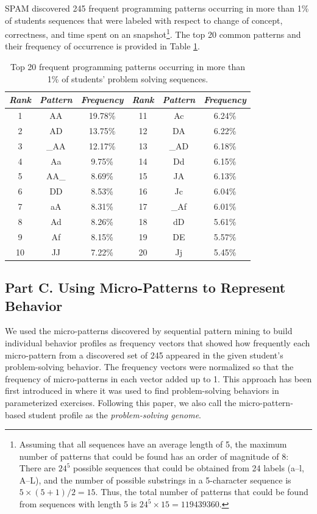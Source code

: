 \documentclass{sigchi}
\begin{document}
SPAM discovered 245 frequent programming patterns occurring in more than 1\% of students sequences that were labeled with respect to change of concept, correctness, and time spent on an snapshot\footnote{Assuming that all sequences have an average length of 5, the maximum number of patterns that could be found has an order of magnitude of 8: There are $24^5$ possible sequences that could be obtained from 24 labels (a--l, A--L), and the number of possible substrings in a 5-character sequence is $5\times(5+1)/2=15$. Thus, the total number of patterns that could be found from sequences with length 5 is $24^5\times15=\num{119439360}$.}. The top 20 common patterns and their frequency of occurrence is provided in Table \ref{table:patterns}.
\begin{table}[thb]
\centering
\begin{tabular}{@{}ccc|ccc@{}}
\small\textit{Rank} & \small\textit{Pattern} & \small\textit{Frequency} & \small\textit{Rank} & \small\textit{Pattern} & \small\textit{Frequency} \\ \midrule
1 & AA & 19.78\% & 11 & Ac & 6.24\% \\
2 & AD & 13.75\% & 12 & DA & 6.22\% \\
3 & \_AA & 12.17\% & 13 & \_AD & 6.18\% \\
4 & Aa & 9.75\% & 14 & Dd & 6.15\% \\
5 & AA\_ & 8.69\% & 15 & JA & 6.13\% \\
6 & DD & 8.53\% & 16 & Jc & 6.04\% \\
7 & aA & 8.31\% & 17 & \_Af & 6.01\% \\
8 & Ad & 8.26\% & 18 & dD & 5.61\% \\
9 & Af & 8.15\% & 19 & DE & 5.57\% \\
10 & JJ & 7.22\% & 20 & Jj & 5.45\% \\ 
\end{tabular}
\caption{Top 20 frequent programming patterns occurring in more than 1\% of students' problem solving sequences.}
\label{table:patterns}
\end{table}

\subsection{Part C. Using Micro-Patterns to Represent Behavior}

We used the micro-patterns discovered by sequential pattern mining to build individual behavior profiles as frequency vectors that showed how frequently each micro-pattern from a discovered set of 245 appeared in the given student's problem-solving behavior. The frequency vectors were normalized so that the frequency of micro-patterns in each vector added up to 1. This approach has been first introduced in \cite{guerra2014problem} where it was used to find problem-solving behaviors in parameterized exercises. Following this paper, we also call the micro-pattern-based student profile as the \textit{problem-solving genome}.
\end{document}
